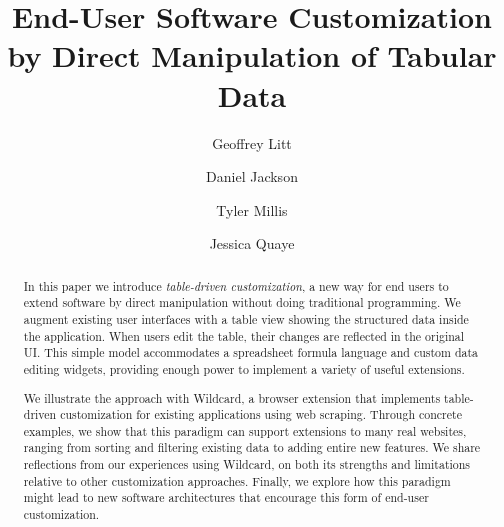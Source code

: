 \documentclass[sigplan,screen,10pt,anonymous,review]{acmart}
\begin{document}
\title{End-User Software Customization by Direct Manipulation of Tabular
Data}


\author{Geoffrey Litt}

\author{Daniel Jackson}

\author{Tyler Millis}

\author{Jessica Quaye}


\begin{abstract}
  In this paper we introduce \emph{table-driven customization}, a new
  way for end users to extend software by direct manipulation without
  doing traditional programming. We augment existing user interfaces
  with a table view showing the structured data inside the application.
  When users edit the table, their changes are reflected in the original
  UI. This simple model accommodates a spreadsheet formula language and
  custom data editing widgets, providing enough power to implement a
  variety of useful extensions.

  We illustrate the approach with Wildcard, a browser extension that
  implements table-driven customization for existing applications using
  web scraping. Through concrete examples, we show that this paradigm
  can support extensions to many real websites, ranging from sorting and
  filtering existing data to adding entire new features. We share
  reflections from our experiences using Wildcard, on both its strengths
  and limitations relative to other customization approaches. Finally,
  we explore how this paradigm might lead to new software architectures
  that encourage this form of end-user customization.
\end{abstract}
\end{document}
